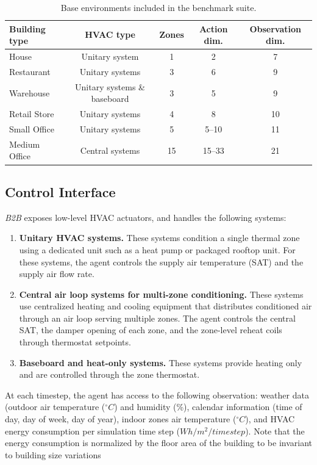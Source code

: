 \documentclass[10pt]{article} %
\newcommand{\btob}{{\textit{B2B}}}
\begin{document}
\begin{table}
\centering
\caption{Base environments included in the benchmark suite.}
\label{tab:base_environments}
\setlength{\tabcolsep}{4pt}
\begin{tabular}{@{}lcccc@{}}
\toprule
Building type & HVAC type & Zones & Action dim. & Observation dim. \\
\midrule
House  & Unitary system & 1  & 2 & 7 \\
Restaurant & Unitary systems & 3 & 6 & 9 \\
Warehouse & Unitary systems \& baseboard & 3 & 5 & 9 \\
Retail Store & Unitary systems & 4 & 8 & 10 \\
Small Office & Unitary systems & 5 & 5--10 & 11 \\
Medium Office & Central systems & 15 & 15--33 & 21 \\
\bottomrule
\end{tabular}
\end{table}

\subsection{Control Interface}

\btob{} exposes low-level HVAC actuators, and handles the following systems:

\begin{enumerate}

\item \textbf{Unitary HVAC systems.}  
These systems condition a single thermal zone using a dedicated unit such as a heat pump or packaged rooftop unit. For these systems, the agent controls the supply air temperature (SAT) and the supply air flow rate.

\item \textbf{Central air loop systems for multi-zone conditioning.}  
These systems use centralized heating and cooling equipment that distributes conditioned air through an air loop serving multiple zones. The agent controls the central SAT, the damper opening of each zone, and the zone-level reheat coils through thermostat setpoints.

\item \textbf{Baseboard and heat-only systems.}  
These systems provide heating only and are controlled through the zone thermostat.

\end{enumerate}

At each timestep, the agent has access to the following observation: 
weather data (outdoor air temperature ($^\circ C$) and humidity (\%), calendar information (time of day, day of week, day of year), indoor zones air temperature ($^\circ C$), and HVAC energy consumption per simulation time step ($Wh/m^2/timestep$). Note that the energy consumption is normalized by the floor area of the building to be invariant to building size variations
\end{document}
